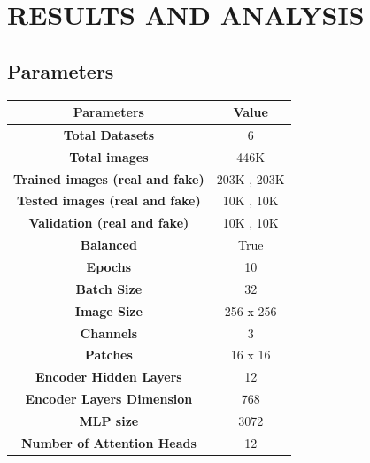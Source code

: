 \section{RESULTS AND ANALYSIS}
\subsection{Parameters}
\begin{table}[h]
    \centering
    \renewcommand{\arraystretch}{1.5} %
    \begin{tabular}{|c|c|}
        \hline
        \textbf{Parameters}                     & \textbf{Value}      \\
        \hline
        \textbf{Total Datasets}                 & 6                   \\
        \hline
        \textbf{Total images}                   & 446K                \\
        \hline
        \textbf{Trained images (real and fake)} & 203K , 203K         \\
        \hline
        \textbf{Tested images (real and fake)}  & 10K , 10K           \\
        \hline
        \textbf{Validation (real and fake)}     & 10K , 10K           \\
        \hline
        \textbf{Balanced}                       & True                \\
        \hline
        \textbf{Epochs}                         & 10                  \\
        \hline
        \textbf{Batch Size}                     & 32                  \\
        \hline
        \textbf{Image Size}                     & 256 x 256           \\
        \hline
        \textbf{Channels}                       & 3                   \\
        \hline
        \textbf{Patches}                        & 16 x 16             \\
        \hline
        \textbf{Encoder Hidden Layers}          & 12                  \\
        \hline
        \textbf{Encoder Layers Dimension}       & 768                 \\
        \hline
        \textbf{MLP size}                       & 3072                \\
        \hline
        \textbf{ Number of Attention Heads }    & 12                  \\

\end{tabular}
\end{table}
